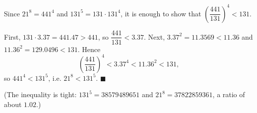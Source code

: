 Since $21^8=441^4$ and $131^5=131\cdot131^4$, it is enough to show that $\left(\dfrac{441}{131}\right)^4<131$.

First, $131\cdot3.37=441.47>441$, so $\dfrac{441}{131}<3.37$. Next, $3.37^2=11.3569<11.36$ and $11.36^2=129.0496<131$. Hence
\[\left(\dfrac{441}{131}\right)^4<3.37^4<11.36^2<131,\]
so $441^4<131^5$, i.e. $21^8<131^5$. $\blacksquare$

(The inequality is tight: $131^5=38579489651$ and $21^8=37822859361$, a ratio of about $1.02$.)
